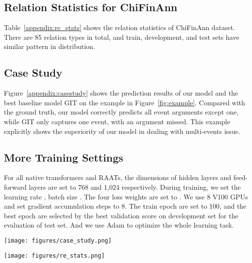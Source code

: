 \documentclass[11pt]{article}
\begin{document}
\subsection{Relation Statistics for ChiFinAnn}
\label{section:A.3}
Table~\ref{appendix:re_stats} shows the relation statistics of ChiFinAnn dataset. There are 85 relation types in total, and train, development, and test sets have similar pattern in distribution.


\subsection{Case Study}
\label{section:A.4}

Figure~\ref{appendix:casestudy} shows the prediction results of our model and the best baseline model GIT on the example in Figure~\ref{fig:example}. Compared with the ground truth, our model correctly predicts all event arguments except one, while GIT only captures one event, with an argument missed. This example explicitly shows the superiority of our model in dealing with multi-events issue.

\subsection{More Training Settings}
\label{section:A.5}
For all native transformers and RAATs, the dimensions of hidden layers and feed-forward layers are set to 768 and 1,024 respectively. During training, we set the learning rate , batch size . The four loss weights are set to . We use 8 V100 GPUs and set gradient accumulation steps to 8. The train epoch are set to 100, and the best epoch are selected by the best validation score on development set for the evaluation of test set. And we use Adam to optimize the whole learning task.
\begin{figure*}
    \centering
    \texttt{[image: figures/case\_study.png]}
    \caption{Case study.}
    \label{appendix:casestudy}
\end{figure*}

\begin{table*}
    \centering
    \texttt{[image: figures/re\_stats.png]}
    \caption{Relation statistics of ChiFinAnn dataset.}
    \label{appendix:re_stats}
\end{table*}
\end{document}
